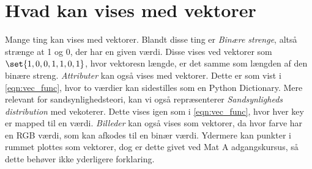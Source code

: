 \section{Hvad kan vises med vektorer}
Mange ting kan vises med vektorer.
Blandt disse ting er \emph{Binære strenge}, altså strænge at 1 og 0, der har en given værdi.
Disse vises ved vektorer som $\set{1,0,0,1,1,0,1}$, hvor vektoresn længde, er det samme som længden af den binære streng.
\emph{Attributer} kan også vises med vektorer.
Dette er som vist i \cref{eqn:vec_func}, hvor to værdier kan sidestilles som en Python Dictionary.
Mere relevant for sandsynlighedsteori, kan vi også repræsenterer \emph{Sandsynligheds distribution} med vekoterer.
Dette vises igen som i \cref{eqn:vec_func}, hvor hver key er mapped til en værdi.
\emph{Billeder} kan også vises som vektorer, da hvor farve har en RGB værdi, som kan afkodes til en binær værdi.
Ydermere kan punkter i rummet plottes som vektorer, dog er dette givet ved Mat A adgangskursus, så dette behøver ikke yderligere forklaring.

